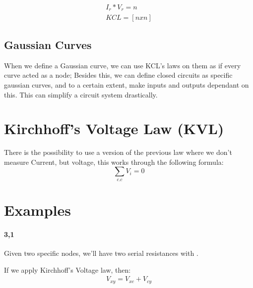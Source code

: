 \documentclass[11pt,fleqn]{book} %
\begin{document}
\begin{gather}
    I_r * V_r = n\\
    KCL = [n x n]
\end{gather}

\subsection{Gaussian Curves}

When we define a Gaussian curve, we can use KCL's laws on them as if every curve acted
as a node; Besides this, we can define closed circuits as specific gaussian curves, and 
to a certain extent, make inputs and outputs dependant on this. This can simplify a circuit 
system drastically.

\section{Kirchhoff's Voltage Law (KVL)}

There is the possibility to use a version of the previous law where
we don't measure Current, but voltage, this works through the following formula:
$$\sum_{c.c}V_{i} = 0$$

\section{Examples}

\paragraph{3,1}

Given two specific nodes, we'll have two serial resistances with . 

If we apply Kirchhoff's Voltage law, then:
\begin{gather}
    V_{xy} = V_{xc} + V_{cy}
\end{gather}
\end{document}
